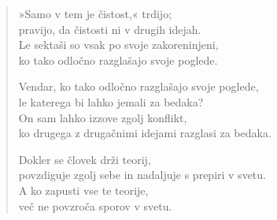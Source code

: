 \begin{verse}
»Samo v tem je čistost,« trdijo;\\
pravijo, da čistosti ni v drugih idejah.\\
Le sektaši so vsak po svoje zakoreninjeni,\\
ko tako odločno razglašajo svoje poglede.

Vendar, ko tako odločno razglašajo svoje poglede,\\
le katerega bi lahko jemali za bedaka?\\
On sam lahko izzove zgolj konflikt,\\
ko drugega z drugačnimi idejami razglasi za bedaka.

Dokler se človek drži teorij,\\
povzdiguje zgolj sebe in nadaljuje s prepiri v svetu.\\
A ko zapusti vse te teorije,\\
več ne povzroča sporov v svetu.

\end{verse}


\clearpage
\begin{verse}


\end{verse}


\clearpage
\begin{verse}


\end{verse}

